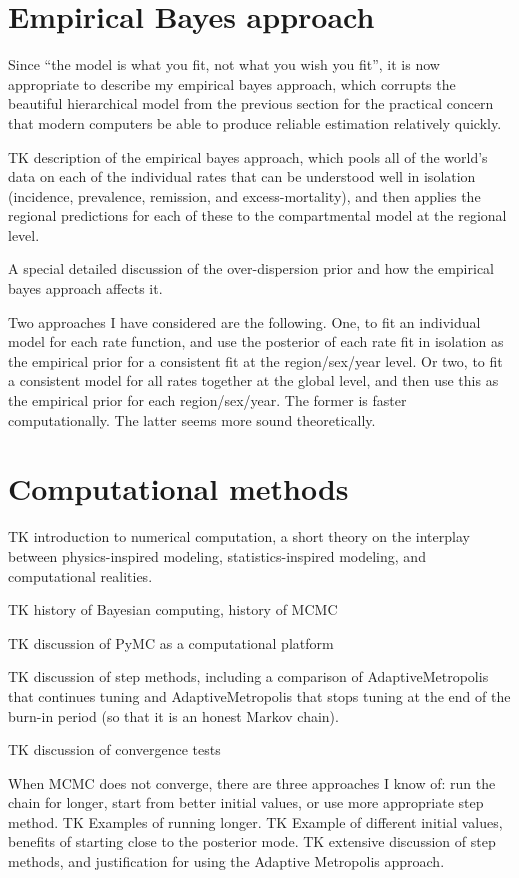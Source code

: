 \section{Empirical Bayes approach}
Since ``the model is what you fit, not what you wish you fit'', it is
now appropriate to describe my empirical bayes approach, which
corrupts the beautiful hierarchical model from the previous section
for the practical concern that modern computers be able to produce
reliable estimation relatively quickly.

TK description of the empirical bayes approach, which pools all of the
world's data on each of the individual rates that can be understood
well in isolation (incidence, prevalence, remission, and
excess-mortality), and then applies the regional predictions for each
of these to the compartmental model at the regional level.

A special detailed discussion of the over-dispersion prior and how the
empirical bayes approach affects it.

Two approaches I have considered are the following.  One, to fit an
individual model for each rate function, and use the posterior of each
rate fit in isolation as the empirical prior for a consistent fit at
the region/sex/year level. Or two, to fit a consistent model for all
rates together at the global level, and then use this as the empirical
prior for each region/sex/year.  The former is faster computationally.
The latter seems more sound theoretically.

\section{Computational methods}
TK introduction to numerical computation, a short theory on the
interplay between physics-inspired modeling, statistics-inspired
modeling, and computational realities.

TK history of Bayesian computing, history of MCMC

TK discussion of PyMC as a computational platform

TK discussion of step methods, including a comparison of
AdaptiveMetropolis that continues tuning and AdaptiveMetropolis that
stops tuning at the end of the burn-in period (so that it is an honest
Markov chain).

TK discussion of convergence tests

When MCMC does not converge, there are three approaches I know of: run
the chain for longer, start from better initial values, or use more
appropriate step method. TK Examples of running longer. TK Example of
different initial values, benefits of starting close to the posterior
mode. TK extensive discussion of step methods, and justification for
using the Adaptive Metropolis approach.

